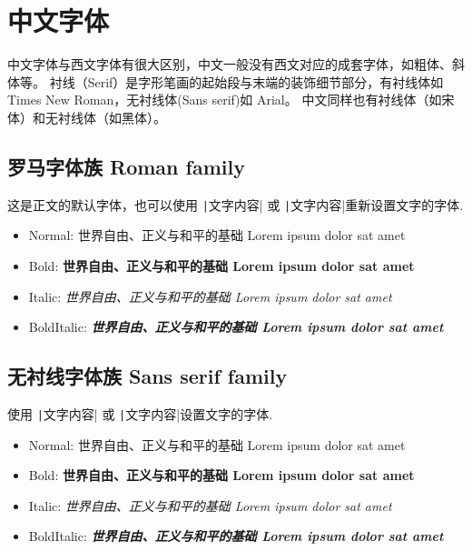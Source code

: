 \section{中文字体}

中文字体与西文字体有很大区别，中文一般没有西文对应的成套字体，如粗体、斜体等。
衬线（Serif）是字形笔画的起始段与末端的装饰细节部分，有衬线体如Times New Roman，无衬线体(Sans serif)如 Arial。
中文同样也有衬线体（如宋体）和无衬线体（如黑体）。

\subsection{罗马字体族 Roman family}

这是正文的默认字体，也可以使用 \texttt|\textrm{文字内容}| 或 \texttt|{\rmfamily 文字内容}|重新设置文字的字体.

\begin{itemize}
  \item Normal: {\rmfamily \mdseries 世界自由、正义与和平的基础 Lorem ipsum dolor sat amet}
  \item Bold: {\rmfamily \bfseries 世界自由、正义与和平的基础 Lorem ipsum dolor sat amet}
  \item Italic: {\rmfamily \itshape 世界自由、正义与和平的基础 Lorem ipsum dolor sat amet}
  \item BoldItalic: {\rmfamily \bfseries \itshape 世界自由、正义与和平的基础 Lorem ipsum dolor sat amet}
\end{itemize}

\subsection{无衬线字体族 Sans serif family}

使用 \texttt|\textsf{文字内容}| 或 \texttt|{\sffamily 文字内容}|设置文字的字体.

\begin{itemize}
  \item Normal: {\sffamily \mdseries 世界自由、正义与和平的基础 Lorem ipsum dolor sat amet}
  \item Bold: {\sffamily \bfseries 世界自由、正义与和平的基础 Lorem ipsum dolor sat amet}
  \item Italic: {\sffamily \itshape 世界自由、正义与和平的基础 Lorem ipsum dolor sat amet}
  \item BoldItalic: {\sffamily \bfseries \itshape 世界自由、正义与和平的基础 Lorem ipsum dolor sat amet}
\end{itemize}

